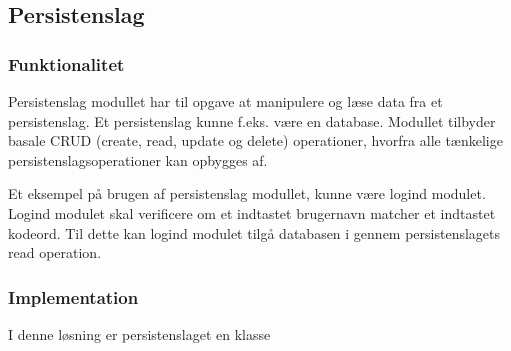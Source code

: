 \subsection{Persistenslag}
\label{sub:persistenslag}

\subsubsection{Funktionalitet}
\label{ssub:Funktionalitet}


Persistenslag modullet har til opgave at manipulere og læse data fra et persistenslag. Et persistenslag kunne f.eks. være en database. Modullet tilbyder basale CRUD (create, read, update og delete) operationer, hvorfra alle tænkelige persistenslagsoperationer kan opbygges af.

Et eksempel på brugen af persistenslag modullet, kunne være logind modulet. Logind modulet skal verificere om et indtastet brugernavn matcher et indtastet kodeord. Til dette kan logind modulet tilgå databasen i gennem persistenslagets read operation.


\subsubsection{Implementation}
\label{ssub:Implementation}

I denne løsning er persistenslaget en klasse 
